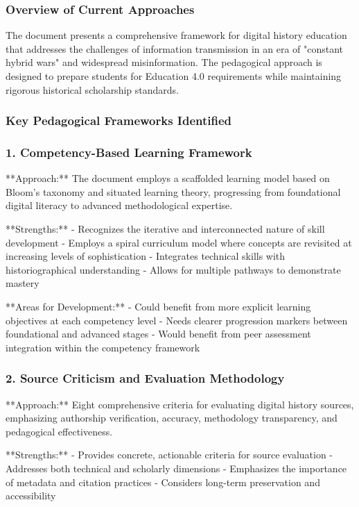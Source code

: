 \subsubsection {Overview of Current Approaches}

The document presents a comprehensive framework for digital history education that addresses the challenges of information transmission in an era of "constant hybrid wars" and widespread misinformation. The pedagogical approach is designed to prepare students for Education 4.0 requirements while maintaining rigorous historical scholarship standards.

\subsubsection {Key Pedagogical Frameworks Identified}

\subsubsection {1. Competency-Based Learning Framework}

**Approach:** The document employs a scaffolded learning model based on Bloom's taxonomy and situated learning theory, progressing from foundational digital literacy to advanced methodological expertise.

**Strengths:**
- Recognizes the iterative and interconnected nature of skill development
- Employs a spiral curriculum model where concepts are revisited at increasing levels of sophistication
- Integrates technical skills with historiographical understanding
- Allows for multiple pathways to demonstrate mastery

**Areas for Development:**
- Could benefit from more explicit learning objectives at each competency level
- Needs clearer progression markers between foundational and advanced stages
- Would benefit from peer assessment integration within the competency framework

\subsubsection {2. Source Criticism and Evaluation Methodology}

**Approach:** Eight comprehensive criteria for evaluating digital history sources, emphasizing authorship verification, accuracy, methodology transparency, and pedagogical effectiveness.

**Strengths:**
- Provides concrete, actionable criteria for source evaluation
- Addresses both technical and scholarly dimensions
- Emphasizes the importance of metadata and citation practices
- Considers long-term preservation and accessibility

